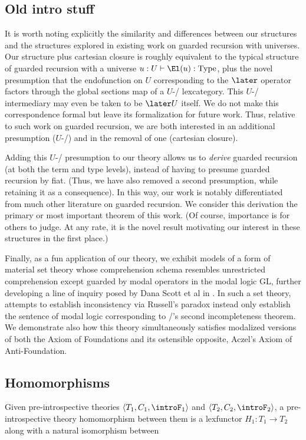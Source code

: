 \subsection{Old intro stuff}
It is worth noting explicitly the similarity and differences between our structures and the structures explored in existing work on guarded recursion with universes. Our structure plus cartesian closure is roughly equivalent to the typical structure of guarded recursion with a universe $u : U \vdash \El(u) : \mathrm{Type}$, plus the novel presumption that the endofunction on $U$ corresponding to the $\later$ operator factors through the global sections map of a $U$-\repsmall/ lexcategory. This $U$-\repsmall/ intermediary may even be taken to be $\later U$ itself. We do not make this correspondence formal but leave its formalization for future work. Thus, relative to such work on guarded recursion, we are both interested in an additional presumption ($U$-\repsmallness/) and in the removal of one (cartesian closure).

Adding this $U$-\repsmallness/ presumption to our theory allows us to \emph{derive} guarded recursion (at both the term and type levels), instead of having to presume guarded recursion by fiat. (Thus, we have also removed a second presumption, while retaining it as a consequence). In this way, our work is notably differentiated from much other literature on guarded recursion. We consider this derivation the primary or most important theorem of this work. (Of course, importance is for others to judge. At any rate, it is the novel result motivating our interest in these structures in the first place.)

Finally, as a fun application of our theory, we exhibit models of a form of material set theory whose comprehension schema resembles unrestricted comprehension except guarded by modal operators in the modal logic GL, further developing a line of inquiry posed by Dana Scott et al in \autocite{FritzScott2018}. In such a set theory, attempts to establish inconsistency via Russell's paradox instead only establish the sentence of modal logic corresponding to \Godel/'s second incompleteness theorem. We demonstrate also how this theory simultaneously satisfies modalized versions of both the Axiom of Foundations and its ostensible opposite, Aczel's Axiom of Anti-Foundation.

\subsection{Homomorphisms}
Given pre-introspective theories $\langle T_1, C_1, \introF_1 \rangle$ and $\langle T_2, C_2, \introF_2 \rangle$, a pre-introspective theory homomorphism between them is a lexfunctor $H_1 : T_1 \to T_2$ along with a natural isomorphism between \TODO

